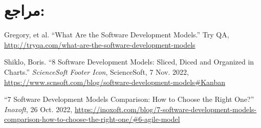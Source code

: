 {\begin{itemize}
\end{itemize}

\section*{مراجع:}

\begin{latin}
	\begingroup
	\renewcommand{\section}[2]{}%
	
\begin{thebibliography}{9}

	Gregory, et al. “What Are the Software Development Models.” Try QA, \url{http://tryqa.com/what-are-the-software-development-models} 

	Shiklo, Boris. “8 Software Development Models: Sliced, Diced and Organized in Charts.” \textit{ScienceSoft Footer Icon}, ScienceSoft, 7 Nov. 2022, \url{https://www.scnsoft.com/blog/software-development-models#Kanban}

	“7 Software Development Models Comparison: How to Choose the Right One?” \textit{Inoxoft}, 26 Oct. 2022, \url{https://inoxoft.com/blog/7-software-development-models-comparison-how-to-choose-the-right-one/#6-agile-model}

	
\end{thebibliography}
\endgroup
\end{latin}

} 






